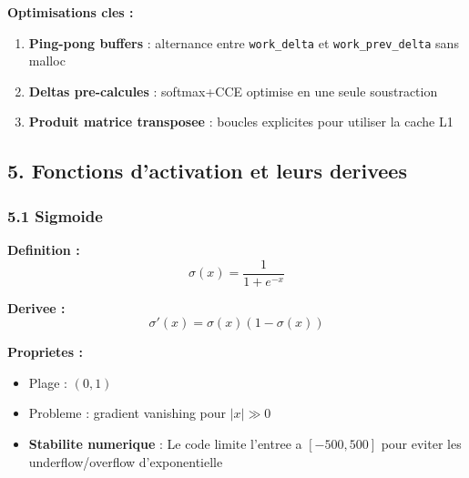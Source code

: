 \documentclass[
  letterpaper,
  DIV=11,
  numbers=noendperiod]{scrartcl}
\providecommand{\tightlist}{%
  \setlength{\itemsep}{0pt}\setlength{\parskip}{0pt}}
\begin{document}
\textbf{Optimisations cles :}
\begin{enumerate}
\def\labelenumi{\arabic{enumi}.}
\tightlist
\item \textbf{Ping-pong buffers} : alternance entre \texttt{work\_delta} et \texttt{work\_prev\_delta} sans malloc
\item \textbf{Deltas pre-calcules} : softmax+CCE optimise en une seule soustraction
\item \textbf{Produit matrice transposee} : boucles explicites pour utiliser la cache L1
\end{enumerate}

\subsection{5. Fonctions d'activation et leurs derivees}\label{fonctions-dactivation}

\subsubsection{5.1 Sigmoide}\label{sigmoide}

\textbf{Definition :} \[\sigma(x) = \frac{1}{1 + e^{-x}}\]

\textbf{Derivee :} \[\sigma'(x) = \sigma(x)(1 - \sigma(x))\]

\textbf{Proprietes :}
\begin{itemize}
\tightlist
\item Plage : \((0, 1)\)
\item Probleme : gradient vanishing pour \(|x| \gg 0\)
\item \textbf{Stabilite numerique} : Le code limite l'entree a \([-500, 500]\) pour eviter les underflow/overflow d'exponentielle
\end{itemize}
\end{document}

